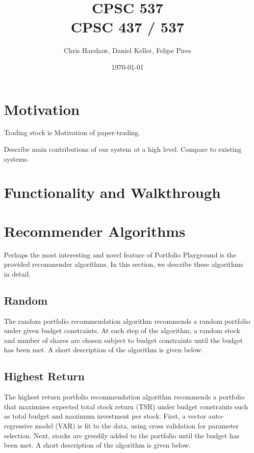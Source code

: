\documentclass{article}
\begin{document}
\title{CPSC 537  \\ CPSC 437 / 537}
\author{Chris Harshaw, Daniel Keller, Felipe Pires}
\date{\today}
\maketitle

\pagestyle{fancy}
\fancyhf{}
\rfoot{\thepage}



\section{Motivation}
Trading stock is 
Motivation of paper-trading.

Describe main contributions of our system at a high level. Compare to existing systems.

\section{Functionality and Walkthrough}

\section{Recommender Algorithms}
Perhaps the most interesting and novel feature of Portfolio Playground is the provided recommender algorithms. In this section, we describe these algorithms in detail.

\subsection{Random}
The random portfolio recommendation algorithm recommends a random portfolio under given budget constraints. At each step of the algorithm, a random stock and number of shares are chosen subject to budget constraints until the budget has been met. A short description of the algorithm is given below.

\subsection{Highest Return}
The highest return portfolio recommendation algorithm recommends a portfolio that maximizes expected total stock return (TSR) under budget constraints such as total budget and maximum investment per stock. First, a vector auto-regressive model (VAR) is fit to the data, using cross validation for parameter selection. Next, stocks are greedily added to the portfolio until the budget has been met. A short description of the algorithm is given below.
\end{document}
